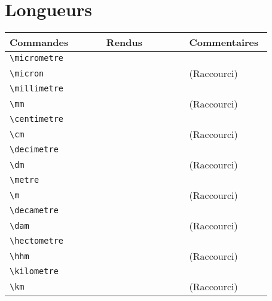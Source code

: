 \documentclass[a4paper,12pt]{article}
\newcommand{\rac}{({\color{red}Raccourci})}
\begin{document}
	\section{Longueurs}
	\noindent
	\begin{tabular}{|p{0.35\linewidth}|p{0.3\linewidth}|p{0.3\linewidth}|}
		\hline
 			\textbf{Commandes}&\textbf{Rendus}&\textbf{Commentaires}
 		\\\hline\hline
 			\verb!\micrometre!	& 	\micrometre	&	\\
 		\hline
			\verb!\micron!		& 	\micron	&	\rac\\
		\hline
			\verb!\millimetre!	& 	\millimetre	&	\\
		\hline
			\verb!\mm!		& 	\mm	&	\rac\\
		\hline
			\verb!\centimetre!	& 	\centimetre	&	\\
		\hline
			\verb!\cm!		& 	\cm	&	\rac\\
		\hline
			\verb!\decimetre!	& 	\decimetre	&	\\
		\hline
			\verb!\dm!		& 	\dm	&	\rac\\
		\hline
			\verb!\metre!		& 	\metre		&	\\
		\hline
			\verb!\m!		& 	\m	&	\rac\\
		\hline
			\verb!\decametre!	& 	\decametre	&	\\
		\hline
			\verb!\dam!		& 	\dam	&	\rac\\
		\hline
			\verb!\hectometre!	& 	\hectometre	&	\\
		\hline
			\verb!\hhm!		& 	\hhm	&	\rac\\
		\hline
			\verb!\kilometre!	& 	\kilometre	&	\\
		\hline
			\verb!\km!		& 	\km	&	\rac\\
		\hline
	\end{tabular}
	
	
\end{document}
